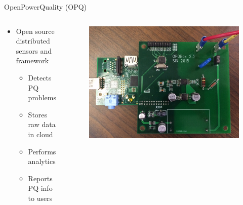 \documentclass{beamer}
\begin{document}
\begin{frame}{OpenPowerQuality (OPQ)}
	\begin{columns}
		\begin{column}{.50\textwidth}
			\begin{itemize}
				\item Open source distributed sensors and framework
				\begin{itemize}
					\item Detects PQ problems
					\item Stores raw data in cloud
					\item Performs analytics
					\item Reports PQ info to users
				\end{itemize}
			\end{itemize}
		\end{column}
		\begin{column}{.50\textwidth}
			\begin{figure}
				\includegraphics[width=\linewidth]{img/box.jpg}
			\end{figure}
		\end{column}
	\end{columns}
\end{frame}
\end{document}
